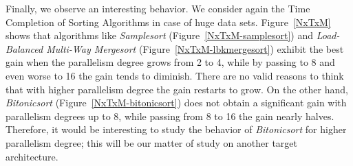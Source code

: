 Finally, we observe an interesting behavior. We consider again the Time Completion of Sorting Algorithms in case of huge data sets. Figure~\ref{NxTxM} shows that algorithms like \textit{Samplesort} (Figure~\ref{NxTxM-samplesort}) and \textit{Load-Balanced Multi-Way Mergesort} (Figure~\ref{NxTxM-lbkmergesort}) exhibit the best gain when the parallelism degree grows from 2 to 4, while by passing to 8 and even worse to 16 the gain tends to diminish. There are no valid reasons to think that with higher parallelism degree the gain restarts to grow. On the other hand, \textit{Bitonicsort} (Figure~\ref{NxTxM-bitonicsort}) does not obtain a significant gain with parallelism degrees up to 8, while passing from 8 to 16 the gain nearly halves. Therefore, it would be interesting to study the behavior of \textit{Bitonicsort} for higher parallelism degree; this will be our matter of study on another target architecture.


